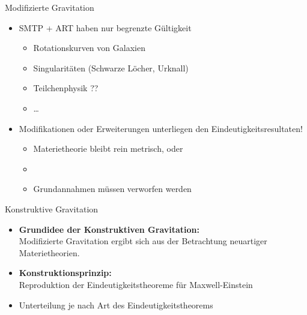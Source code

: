 \documentclass{beamer}
\begin{document}
    \begin{frame}{Modifizierte Gravitation}
        \begin{itemize}
            \item SMTP + ART haben nur begrenzte Gültigkeit \pause
            \begin{itemize}
                \item Rotationskurven von Galaxien \pause
                \item Singularitäten (Schwarze Löcher, Urknall) \pause
                \item Teilchenphysik ?? \pause
                \item \ldots \pause
            \end{itemize}
            \item Modifikationen oder Erweiterungen unterliegen den Eindeutigkeitsresultaten! \pause
            \begin{itemize}
                \item Materietheorie bleibt rein metrisch, oder \pause
                \item {} \pause
                \item Grundannahmen müssen verworfen werden \pause
            \end{itemize}
        \end{itemize}
    \end{frame}

    \begin{frame}{Konstruktive Gravitation}
        \begin{itemize}
            \item \textbf{Grundidee der Konstruktiven Gravitation:} \\
            Modifizierte Gravitation ergibt sich aus der Betrachtung neuartiger Materietheorien. \pause
            \item \textbf{Konstruktionsprinzip:} \\
            Reproduktion der Eindeutigkeitstheoreme für Maxwell-Einstein \pause
            \item Unterteilung je nach Art des Eindeutigkeitstheorems
        \end{itemize}
    \end{frame}
\end{document}
